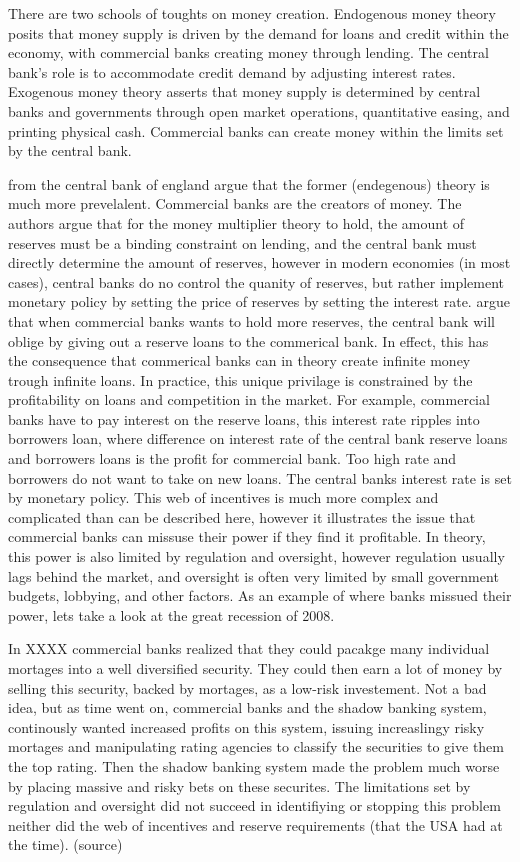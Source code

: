 There are two schools of toughts on money creation. Endogenous money theory posits that money supply is driven by the demand for loans and credit within the economy, with commercial banks creating money through lending. The central bank's role is to accommodate credit demand by adjusting interest rates. Exogenous money theory asserts that money supply is determined by central banks and governments through open market operations, quantitative easing, and printing physical cash. Commercial banks can create money within the limits set by the central bank. 

\textcite{mcleay2014money} from the central bank of england argue that the former (endegenous) theory is much more prevelalent. Commercial banks are the creators of money. The authors argue that for the money multiplier theory to hold, the amount of reserves must be a binding constraint on lending, and the central bank must directly determine the amount of reserves, however in modern economies (in most cases), central banks do no control the quanity of reserves, but rather implement monetary policy by setting the price of reserves by setting the interest rate. \textcite{chicagorevisited} argue that when commercial banks wants to hold more reserves, the central bank will oblige by giving out a reserve loans to the commerical bank. In effect, this has the consequence that commerical banks can in theory create infinite money trough infinite loans. In practice, this unique privilage is constrained by the profitability on loans and competition in the market. For example, commercial banks have to pay interest on the reserve loans, this interest rate ripples into borrowers loan, where difference on interest rate of the central bank reserve loans and borrowers loans is the profit for commercial bank. Too high rate and borrowers do not want to take on new loans. The central banks interest rate is set by monetary policy.  This web of incentives is much more complex and complicated than can be described here, however it illustrates the issue that commercial banks can missuse their power if they find it profitable. In theory, this power is also limited by regulation and oversight, however regulation usually lags behind the market, and oversight is often very limited by small government budgets, lobbying, and other factors. As an example of where banks missued their power, lets take a look at the great recession of 2008.

In XXXX commercial banks realized that they could pacakge many individual mortages into a well diversified security. They could then earn a lot of money by selling this security, backed by mortages, as a low-risk investement. Not a bad idea, but as time went on, commercial banks and the shadow banking system, continously wanted increased profits on this system, issuing increaslingy risky mortages and manipulating rating agencies to classify the securities to give them the top rating. Then the shadow banking system made the problem much worse by placing massive and risky bets on these securites. The limitations set by regulation and oversight did not succeed in identifiying or stopping this problem neither did the web of incentives and reserve requirements (that the USA had at the time). (source)

